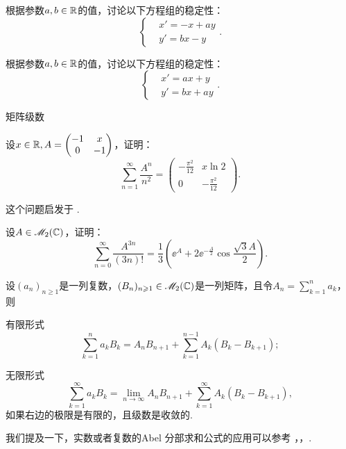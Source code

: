 \begin{problem}
  根据参数$a,b\in\mathbb R$的值，讨论以下方程组的稳定性：
  \[
    \left\{
      \begin{aligned}
        & x' = -x + ay \\
        & y' = bx - y
      \end{aligned}
    \right..
  \]
\end{problem}

\begin{problem}
  根据参数$a,b\in\mathbb R$的值，讨论以下方程组的稳定性：
  \[
    \left\{
      \begin{aligned}
        & x' = ax + y \\
        & y' = bx + ay
      \end{aligned}
    \right..
  \]
\end{problem}

{\kaishu 矩阵级数}
\begin{problem}
  设$x\in\mathbb R,A=\begin{pmatrix}
    -1 & x \\
    0 & -1
  \end{pmatrix}$，证明：
  \[
    \sum_{n=1}^\infty \frac{A^n}{n^2} = \begin{pmatrix}
    -\frac{\pi^2}{12} & x\ln2 \\
    0 & -\frac{\pi^2}{12}
    \end{pmatrix}.
  \]
\end{problem}
\begin{remark}
  这个问题启发于 \cite[problem12, p.65]{63}.
\end{remark}

\begin{problem}
  设$A\in\mathscr M_2(\mathbb C)$，证明：
  \[
    \sum_{n=0}^\infty \frac{A^{3n}}{(3n)!}  = \frac13 \left( \ee^A + 2\ee^{-\frac A2}\cos \frac{\sqrt3A}2 \right).
  \]
\end{problem}

\begin{mybox}
  \begin{problem}[矩阵的Abel分部求和公式.]

    设$(a_n)_{n\ge1}$是一列复数，$(B_n)_{n\geqslant1}\in\mathscr M_2(\mathbb C)$是一列矩阵，且令$A_n=\sum_{k=1}^na_k$，则
    \begin{enum}
      \item\label{prob4.62a} {\kaishu 有限形式}
      \[
        \sum_{k=1}^na_kB_k = A_nB_{n+1} + \sum_{k=1}^{n-1}A_k(B_k - B_{k+1});
      \]
      \item\label{prob4.62b} {\kaishu 无限形式}
      \[
        \sum_{k=1}^\infty a_kB_k = \lim_{n\to\infty}A_nB_{n+1} + \sum_{k=1}^\infty A_k(B_k - B_{k+1}),
      \]
      如果右边的极限是有限的，且级数是收敛的.
    \end{enum}
  \end{problem}
\end{mybox}
\begin{remark}
  我们提及一下，实数或者复数的{\kaishu Abel 分部求和公式}的应用可以参考 \cite[p.55]{11}，\cite[p.258]{22}，\cite[p.26]{57}.
\end{remark}

